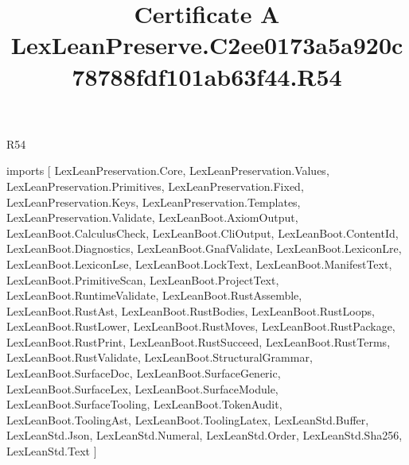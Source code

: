 \begin{lexlean}{R54}
\title{Certificate A LexLeanPreserve.C2ee0173a5a920c78788fdf101ab63f44.R54}
\begin{coremodule}
imports [
  LexLeanPreservation.Core,
  LexLeanPreservation.Values,
  LexLeanPreservation.Primitives,
  LexLeanPreservation.Fixed,
  LexLeanPreservation.Keys,
  LexLeanPreservation.Templates,
  LexLeanPreservation.Validate,
  LexLeanBoot.AxiomOutput,
  LexLeanBoot.CalculusCheck,
  LexLeanBoot.CliOutput,
  LexLeanBoot.ContentId,
  LexLeanBoot.Diagnostics,
  LexLeanBoot.GnafValidate,
  LexLeanBoot.LexiconLre,
  LexLeanBoot.LexiconLse,
  LexLeanBoot.LockText,
  LexLeanBoot.ManifestText,
  LexLeanBoot.PrimitiveScan,
  LexLeanBoot.ProjectText,
  LexLeanBoot.RuntimeValidate,
  LexLeanBoot.RustAssemble,
  LexLeanBoot.RustAst,
  LexLeanBoot.RustBodies,
  LexLeanBoot.RustLoops,
  LexLeanBoot.RustLower,
  LexLeanBoot.RustMoves,
  LexLeanBoot.RustPackage,
  LexLeanBoot.RustPrint,
  LexLeanBoot.RustSucceed,
  LexLeanBoot.RustTerms,
  LexLeanBoot.RustValidate,
  LexLeanBoot.StructuralGrammar,
  LexLeanBoot.SurfaceDoc,
  LexLeanBoot.SurfaceGeneric,
  LexLeanBoot.SurfaceLex,
  LexLeanBoot.SurfaceModule,
  LexLeanBoot.SurfaceTooling,
  LexLeanBoot.TokenAudit,
  LexLeanBoot.ToolingAst,
  LexLeanBoot.ToolingLatex,
  LexLeanStd.Buffer,
  LexLeanStd.Json,
  LexLeanStd.Numeral,
  LexLeanStd.Order,
  LexLeanStd.Sha256,
  LexLeanStd.Text
]


\end{coremodule}
\end{lexlean}

